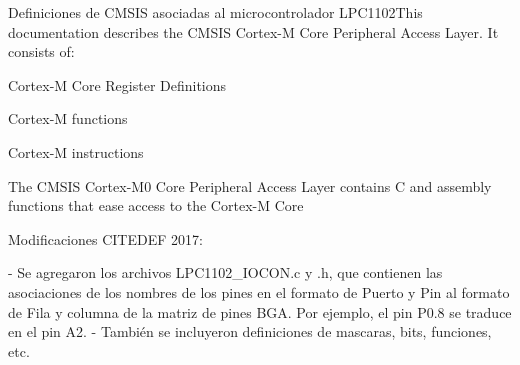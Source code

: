 Definiciones de C\+M\+S\+IS asociadas al microcontrolador L\+P\+C1102\+This documentation describes the C\+M\+S\+IS Cortex-\/M Core Peripheral Access Layer. It consists of\+:


\begin{DoxyItemize}
\item Cortex-\/M Core Register Definitions
\item Cortex-\/M functions
\item Cortex-\/M instructions
\end{DoxyItemize}

The C\+M\+S\+IS Cortex-\/\+M0 Core Peripheral Access Layer contains C and assembly functions that ease access to the Cortex-\/M Core

Modificaciones C\+I\+T\+E\+D\+EF 2017\+: \begin{DoxyVerb}  - Se agregaron los archivos LPC1102_IOCON.c y .h, que contienen las asociaciones de
    los nombres de los pines en el formato de Puerto y Pin al formato de Fila y columna
    de la matriz de pines BGA. Por ejemplo, el pin P0.8 se traduce en el pin A2.
  - También se incluyeron definiciones de mascaras, bits, funciones, etc.\end{DoxyVerb}
 